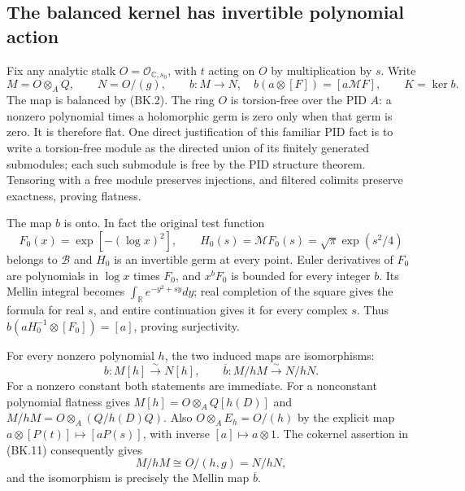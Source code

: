\subsection{The balanced kernel has invertible polynomial action}

Fix any analytic stalk $O=\mathcal O_{\mathbb C,s_0}$, with
$t$ acting on $O$ by multiplication by $s$.  Write
\[
 M=O\otimes_AQ,\qquad N=O/(g),\qquad
 b:M\to N,\quad b(a\otimes[F])=[a\mathcal MF],\qquad K=\ker b.
                                                               \tag{BK.12}
\]
The map is balanced by (BK.2).  The ring $O$ is torsion-free over
the PID $A$: a nonzero polynomial times a holomorphic germ is zero
only when that germ is zero.  It is therefore flat.  One direct
justification of this familiar PID fact is to write a torsion-free
module as the directed union of its finitely generated submodules;
each such submodule is free by the PID structure theorem.  Tensoring
with a free module preserves injections, and filtered colimits
preserve exactness, proving flatness.

The map $b$ is onto.  In fact the original test function
\[
 F_0(x)=\exp[-(\log x)^2],\qquad
 H_0(s)=\mathcal MF_0(s)=\sqrt\pi\exp(s^2/4)     \tag{BK.13}
\]
belongs to $\mathscr B$ and $H_0$ is an invertible germ at every
point.  Euler derivatives of $F_0$ are polynomials in $\log x$
times $F_0$, and $x^bF_0$ is bounded for every integer $b$.
Its Mellin integral becomes
$\int_{\mathbb R}e^{-y^2+sy}dy$; real completion of the square
gives the formula for real $s$, and entire continuation gives it
for every complex $s$.  Thus
$b(aH_0^{-1}\otimes[F_0])=[a]$, proving surjectivity.

For every nonzero polynomial $h$, the two induced maps are
isomorphisms:
\[
 b:M[h]\xrightarrow{\sim}N[h],\qquad
 \overline b:M/hM\xrightarrow{\sim}N/hN.        \tag{BK.14}
\]
For a nonzero constant both statements are immediate.  For a
nonconstant polynomial flatness gives
$M[h]=O\otimes_AQ[h(D)]$ and
$M/hM=O\otimes_A(Q/h(D)Q)$.
Also $O\otimes_AE_h=O/(h)$ by the explicit map
$a\otimes[P(t)]\mapsto[aP(s)]$, with inverse $[a]\mapsto a\otimes1$.
The cokernel assertion in (BK.11) consequently gives
\[
 M/hM\cong O/(h,g)=N/hN,
\]
and the isomorphism is precisely the Mellin map $\overline b$.

